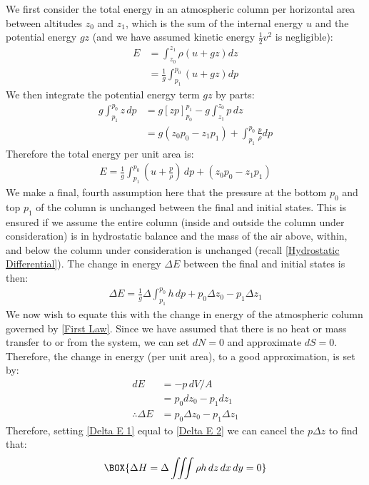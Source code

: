We first consider the total energy in an atmospheric column per horizontal area between altitudes $z_0$ and $z_1$, which is the sum of the internal energy $u$ and the potential energy $gz$ (and we have assumed kinetic energy $\frac{1}{2}v^2$ is negligible):
\begin{align*}
    E &= \int_{z_0}^{z_1} \rho \left( u + gz \right)dz\\
    &=\frac{1}{g}\int_{p_1}^{p_0} \left( u+gz \right)dp
\end{align*}
We then integrate the potential energy term $gz$ by parts:
\begin{align*}
    g\int_{p_1}^{p_0} z\,dp &= g\left[ zp \right]_{p_0}^{p_1}-g\int_{z_1}^{z_0}p\,dz\\
    &=g(z_0p_0-z_1p_1)+\int_{p_1}^{p_0}\frac{p}{\rho}dp
\end{align*}
Therefore the total energy per unit area is:
\begin{align*}
    E=\frac{1}{g}\int_{p_1}^{p_0}\left(u+\frac{p}{\rho} \right)\,dp+(z_0p_0-z_1p_1)
\end{align*}
We make a final, fourth assumption here that the pressure at the bottom $p_0$ and top $p_1$ of the column is unchanged between the final and initial states. This is ensured if we assume the entire column (inside and outside the column under consideration) is in hydrostatic balance and the mass of the air above, within, and below the column under consideration is unchanged (recall \ref{Hydrostatic Differential}). The change in energy $\Delta E$ between the final and initial states is then:
\begin{align}
    \label{Delta E 1}
    \Delta E = \frac{1}{g}\Delta \int_{p_1}^{p_0}h\,dp + p_0 \Delta z_0 - p_1 \Delta z_1
\end{align}
We now wish to equate this with the change in energy of the atmospheric column governed by \ref{First Law}. Since we have assumed that there is no heat or mass transfer to or from the system, we can set $dN=0$ and approximate $dS=0$. Therefore, the change in energy (per unit area), to a good approximation, is set by:
\begin{align}
    dE &= -p\,dV/A\nonumber\\
    &=p_0 d z_0-p_1 d z_1\nonumber\\
    \label{Delta E 2}
    \therefore \Delta E & = p_0 \Delta z_0 - p_1 \Delta z_1 
\end{align}
Therefore, setting \ref{Delta E 1} equal to \ref{Delta E 2} we can cancel the $p\Delta z$ to find that:
\begin{align}
    \BOX{\Delta H = \Delta \iiint \rho h \,dz\,dx\,dy=0}
\end{align}
